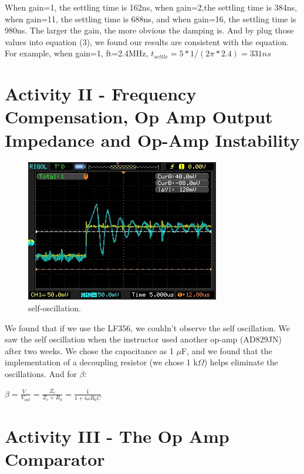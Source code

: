 \documentclass[11pt]{article}
\begin{document}
When gain=1, the settling time is 162ns, when gain=2,the settling time is 384ns, when gain=11, the settling time is 688ns, and when gain=16, the settling time is 980ns. The larger the gain, the more obvious the damping is. And by plug those values into equation (3), we found our results are consistent with the equation. For example, when gain=1, ft=2.4MHz, $t_{settle}=5*1/(2\pi *2.4)=331ns$


\section{Activity II - Frequency Compensation, Op Amp Output Impedance and Op-Amp Instability}


\begin{figure}[H]
 \begin{center}
  \includegraphics[width=\linewidth/1]{selfoscillation}
  \caption{self-oscillation.}
  \label{fig:selfoscillation}
 \end{center}
\end{figure}

We found that if we use the LF356, we couldn't observe the self oscillation. We saw the self oscillation when the instructor used another op-amp (AD829JN) after two weeks. We chose the capacitance as 1 $\mu$F, and we found that the implementation of a decoupling resistor (we chose 1 k$\Omega$) helps eliminate the oscillations. And for $\beta$:

$\beta = \frac{V_{-}}{V_{out}}=\frac{Z_{c}}{Z_{c}+R_{0}}=\frac{1}{1+i\omega R_{0}C}$

\section{Activity III - The Op Amp Comparator}
\end{document}

